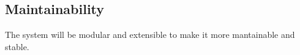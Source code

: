 \subsection{Maintainability}
The system will be modular and extensible to make it more mantainable and stable.